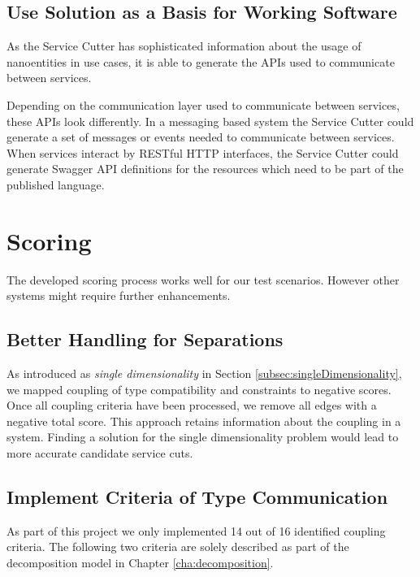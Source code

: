 
\subsection{Use Solution as a Basis for Working Software}

As the Service Cutter has sophisticated information about the usage of nanoentities in use cases, it is able to generate the APIs used to communicate between services. 

Depending on the communication layer used to communicate between services, these \gls{API}s look differently. In a messaging based system the Service Cutter could generate a set of messages or events needed to communicate between services. When services interact by RESTful HTTP interfaces, the Service Cutter could generate Swagger\cite{swagger} \gls{API} definitions for the resources which need to be part of the published language. 

\section{Scoring}

The developed scoring process works well for our test scenarios. However other systems might require further enhancements.

\subsection{Better Handling for Separations}
\label{sec:handling-for-separations}

As introduced as \textit{single dimensionality} in Section \ref{subsec:singleDimensionality}, we mapped coupling of type compatibility and constraints to negative scores. Once all coupling criteria have been processed, we remove all edges with a negative total score. This approach retains information about the coupling in a system. Finding a solution for the single dimensionality problem would lead to more accurate candidate service cuts.

\subsection{Implement Criteria of Type Communication}

As part of this project we only implemented 14 out of 16 identified coupling criteria. The following two criteria are solely described as part of the decomposition model in Chapter \ref{cha:decomposition}.

